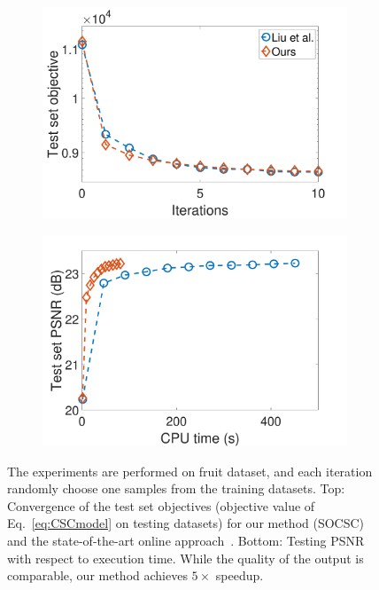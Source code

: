 \begin{figure}[h]
\centering
\begin{subfigure}{0.49\textwidth}
  \includegraphics[width=1\linewidth]{figure/onlineVSliu-ite-fruit.pdf}
\end{subfigure}
\begin{subfigure}{0.49\textwidth}
  \includegraphics[width=1\linewidth]{figure/onlineVSliu-time-fruit.pdf}
\end{subfigure}

\caption{The experiments are performed on fruit dataset, and each iteration randomly choose one samples from the training datasets. Top: Convergence of the test set objectives (objective value of Eq.~\ref{eq:CSCmodel} on testing datasets) for our method (SOCSC) and the state-of-the-art online approach~\cite{liu-2018-first}. Bottom: Testing PSNR with respect to execution time. While the quality of the output is comparable, our method achieves $5 \times$ speedup.}
\label{fig:onlineSmall}
\end{figure}

